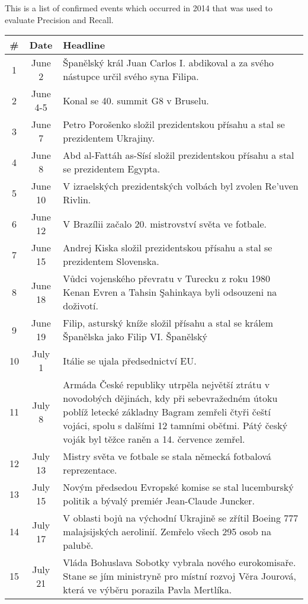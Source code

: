 This is a list of confirmed events which occurred in 2014 that was used to evaluate Precision and Recall.

\begin{tabularx}{\linewidth}{@{}c @{}c X@{}}\toprule[1.5pt]
\bf \# & \bf Date & \bf Headline \\ \midrule
1 & June 2 & Španělský král Juan Carlos I. abdikoval a za svého nástupce určil svého syna Filipa. \\ \midrule
2 & June 4-5 & Konal se 40. summit G8 v Bruselu. \\ \midrule
3 & June 7 & Petro Porošenko složil prezidentskou přísahu a stal se prezidentem Ukrajiny. \\ \midrule
4 & June 8 & Abd al-Fattáh as-Sísí složil prezidentskou přísahu a stal se prezidentem Egypta. \\ \midrule
5 & June 10 & V izraelských prezidentských volbách byl zvolen Re'uven Rivlin. \\ \midrule
6 & June 12 & V Brazílii začalo 20. mistrovství světa ve fotbale. \\ \midrule
7 & June 15 & Andrej Kiska složil prezidentskou přísahu a stal se prezidentem Slovenska. \\ \midrule
8 & June 18 & Vůdci vojenského převratu v Turecku z roku 1980 Kenan Evren a Tahsin Şahinkaya byli odsouzeni na doživotí. \\ \midrule
9 & June 19 & Filip, asturský kníže složil přísahu a stal se králem Španělska jako Filip VI. Španělský \\ \midrule
10 & July 1 & Itálie se ujala předsednictví EU. \\ \midrule
11 & July 8 & Armáda České republiky utrpěla největší ztrátu v novodobých dějinách, kdy při sebevražedném útoku poblíž letecké základny Bagram zemřeli čtyři čeští vojáci, spolu s dalšími 12 tamními oběťmi. Pátý český voják byl těžce raněn a 14. července zemřel. \\ \midrule
12 & July 13 & Mistry světa ve fotbale se stala německá fotbalová reprezentace. \\ \midrule
13 & July 15 & Novým předsedou Evropské komise se stal lucemburský politik a bývalý premiér Jean-Claude Juncker. \\ \midrule
14 & July 17 & V oblasti bojů na východní Ukrajině se zřítil Boeing 777 malajsijských aerolinií. Zemřelo všech 295 osob na palubě. \\ \midrule
15 & July 21 & Vláda Bohuslava Sobotky vybrala nového eurokomisaře. Stane se jím ministryně pro místní rozvoj Věra Jourová, která ve výběru porazila Pavla Mertlíka. \\ \midrule

\end{tabularx}
